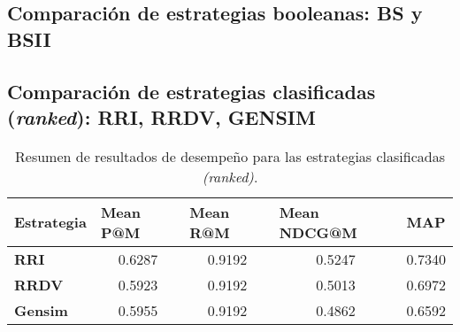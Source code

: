 \subsection{Comparación de estrategias booleanas: BS y BSII}


\subsection{Comparación de estrategias clasificadas (\textit{ranked}): RRI, RRDV, GENSIM }



\begin{table}[H]
\centering
\begin{tabular}{|l|c|c|c|c|}
\hline
\textbf{Estrategia} & \multicolumn{1}{l|}{\textbf{Mean P@M}} & \multicolumn{1}{l|}{\textbf{Mean R@M}} & \multicolumn{1}{l|}{\textbf{Mean NDCG@M}} & \multicolumn{1}{l|}{\textbf{MAP}} \\ \hline
\textbf{RRI} & 0.6287 & 0.9192 & 0.5247 & 0.7340 \\ \hline
\textbf{RRDV} & 0.5923 & 0.9192 & 0.5013 & 0.6972 \\ \hline
\textbf{Gensim} & 0.5955 & 0.9192 & 0.4862 & 0.6592 \\ \hline
\end{tabular}
\caption{Resumen de resultados de desempeño para las estrategias clasificadas \textit{(ranked)}.}
\label{tab:rankedResults}
\end{table}


